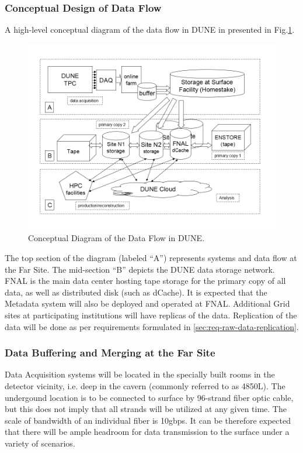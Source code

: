\subsubsection{Conceptual Design of Data Flow}
A high-level conceptual diagram of the data flow in DUNE in presented in Fig.\ref{fig:DUNEdataflow}.
\begin{figure}[h!]
\centering
\includegraphics[width=\textwidth]{DUNEdataflow.png}
\caption{Conceptual Diagram of the Data Flow in DUNE.}
\label{fig:DUNEdataflow}
\end{figure}

\noindent
The top section of the diagram (labeled ``A'') represents systems and data flow at the Far Site.
The mid-section ``B'' depicts the DUNE data storage network. FNAL is the main data center
hosting tape storage for the primary copy of all data, as well as distributed disk (such as dCache).
It is expected that the Metadata system will also be deployed and operated at FNAL.
Additional Grid sites at participating institutions will have replicas of the data.
Replication of the data will be done as per requirements formulated in \ref{sec:req-raw-data-replication}.

\subsubsection{Data Buffering and Merging at the Far Site}
Data Acquisition systems will be located in the specially built rooms in the detector vicinity, i.e. deep in the cavern (commonly referred to as 4850L).
The undergound location is to be connected to surface by 96-strand fiber optic cable, but this does not imply that all strands will be
utilized at any given time. The scale of bandwidth of an individual fiber is 10gbps. It can be therefore expected that there will be ample headroom
for data transmission to the surface under a variety of scenarios.

